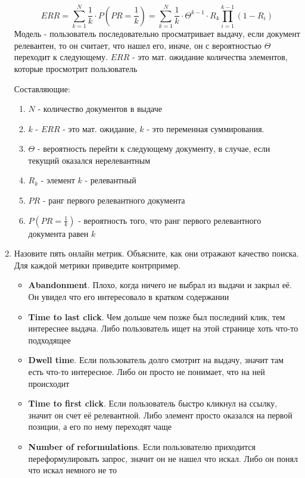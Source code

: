 \begin{enumerate}
	\begin{equation*}
		ERR = \sum\limits_{k = 1}^{N}\frac{1}{k}\cdot P(PR = \frac{1}{k}) = 
		\sum\limits_{k = 1}^{N}\frac{1}{k}\cdot \varTheta^{k - 1}\cdot R_k \prod\limits_{i = 
		1}^ {k - 1}(1 - R_i) 
	\end{equation*}
	Модель - пользователь последовательно просматривает выдачу, если документ релевантен, то он считает, что нашел его, иначе, он с вероятностью $\varTheta$ переходит к следующему. $ERR$ - это мат. ожидание количества элементов, которые просмотрит пользователь 
	
	Составляющие:
	\begin{enumerate}
		\item $N$ - количество документов в выдаче
		\item $k$ - $ERR$ - это мат. ожидание, $k$ - это переменная суммирования.
		\item $\varTheta$ - вероятность перейти к следующему документу, в случае, если текущий оказался нерелевантным
		\item $R_k$ - элемент $k$ - релевантный
		\item $PR$ - ранг первого релевантного документа
		\item $P(PR = \frac{1}{k})$ - вероятность того, что ранг первого релевантного документа равен $k$
	\end{enumerate}

	\item Назовите пять онлайн метрик. Объясните, как они отражают качество поиска. Для 
	каждой метрики приведите контрпример.
	\begin{itemize}
		\item \textbf{Abandonment}. Плохо, когда ничего не выбрал из выдачи и закрыл её. Он 
		увидел что его интересовало в кратком содержании
		\item \textbf{Time to last click}. Чем дольше чем позже был последний клик, тем 
		интереснее выдача. Либо пользователь ищет на этой странице хоть что-то подходящее 
		\item \textbf{Dwell time}. Если пользователь долго смотрит на выдачу, значит там 
		есть что-то интересное. Либо он просто не понимает, что на ней происходит
		\item \textbf{Time to first click}. Если пользователь быстро кликнул на ссылку, 
		значит он счет её релевантной. Либо элемент просто оказался на первой позиции, а его 
		по нему переходят чаще
		\item \textbf{Number of reformulations}. Если пользователю приходится 
		переформулировать запрос, значит он не нашел что искал. Либо он понял что искал 
		немного не то
	\end{itemize}
	

\end{enumerate}
